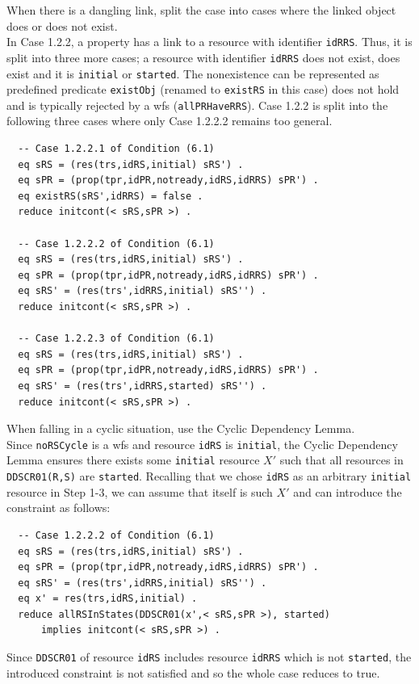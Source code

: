 \documentclass[12pt]{report}
\newcommand{\stt}[1]{{\small{\tt {#1}}}}
\begin{document}
 When there is a dangling link, split the case
into cases where the linked object does or does not exist. \\ In Case
1.2.2, a property has a link to a resource with identifier
{\tt idRRS}. Thus, it is split into three more cases; a resource with
identifier {\tt idRRS} does not exist, does exist and it is
{\tt initial} or {\tt started}. The nonexistence can be represented as
predefined predicate {\tt existObj} (renamed to {\tt existRS} in this
case) does not hold and is typically rejected by a wfs
({\tt allPRHaveRRS}).  Case 1.2.2 is split into the following three
cases where only Case 1.2.2.2 remains too general.
\begin{verbatim}
  -- Case 1.2.2.1 of Condition (6.1)
  eq sRS = (res(trs,idRS,initial) sRS') .
  eq sPR = (prop(tpr,idPR,notready,idRS,idRRS) sPR') .
  eq existRS(sRS',idRRS) = false .
  reduce initcont(< sRS,sPR >) .

  -- Case 1.2.2.2 of Condition (6.1)
  eq sRS = (res(trs,idRS,initial) sRS') .
  eq sPR = (prop(tpr,idPR,notready,idRS,idRRS) sPR') .
  eq sRS' = (res(trs',idRRS,initial) sRS'') .
  reduce initcont(< sRS,sPR >) .

  -- Case 1.2.2.3 of Condition (6.1)
  eq sRS = (res(trs,idRS,initial) sRS') .
  eq sPR = (prop(tpr,idPR,notready,idRS,idRRS) sPR') .
  eq sRS' = (res(trs',idRRS,started) sRS'') .
  reduce initcont(< sRS,sPR >) .
\end{verbatim}
 When falling in a cyclic situation, use the
Cyclic Dependency Lemma. \\ Since {\tt noRSCycle} is a wfs and
resource {\tt idRS} is {\tt initial}, the Cyclic Dependency Lemma
ensures there exists some {\tt initial} resource $X'$ such that all
resources in \stt{DDSCR01(R,S)} are {\tt started}. Recalling that we
chose {\tt idRS} as an arbitrary {\tt initial} resource in Step 1-3,
we can assume that itself is such $X'$ and can introduce the
constraint as follows:
\begin{verbatim}
  -- Case 1.2.2.2 of Condition (6.1)
  eq sRS = (res(trs,idRS,initial) sRS') .
  eq sPR = (prop(tpr,idPR,notready,idRS,idRRS) sPR') .
  eq sRS' = (res(trs',idRRS,initial) sRS'') .
  eq x' = res(trs,idRS,initial) .
  reduce allRSInStates(DDSCR01(x',< sRS,sPR >), started)
      implies initcont(< sRS,sPR >) .
\end{verbatim}
Since {\tt DDSCR01} of resource {\tt idRS} includes resource
{\tt idRRS} which is not {\tt started}, the introduced constraint
is not satisfied and so the whole case reduces to true.
\end{document}
